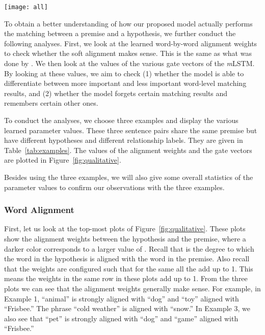 \documentclass[11pt,letterpaper]{article}
\begin{document}
\begin{figure*}[!ht]
\centering
\texttt{[image: all]}
\caption{The alignment weights and the gate vectors of the three examples.}
\label{fig:qualitative}
\end{figure*}


To obtain a better understanding of how our proposed model actually performs the matching between a premise and a hypothesis, we further conduct the following analyses.
First, we look at the learned word-by-word alignment weights  to check whether the soft alignment makes sense.
This is the same as what was done by .
We then look at the values of the various gate vectors of the {\emph{m}LSTM}.
By looking at these values, we aim to check (1) whether the model is able to differentiate between more important and less important word-level matching results, and (2) whether the model forgets certain matching results and remembers certain other ones.

To conduct the analyses, we choose three examples and display the various learned parameter values.
These three sentence pairs share the same premise but have different hypotheses and different relationship labels.
They are given in Table~\ref{tab:examples}.
The values of the alignment weights and the gate vectors are plotted in Figure~\ref{fig:qualitative}.

Besides using the three examples, we will also give some overall statistics of the parameter values to confirm our observations with the three examples.

\subsubsection*{Word Alignment}

First, let us look at the top-most plots of Figure~\ref{fig:qualitative}.
These plots show the alignment weights  between the hypothesis and the premise, where a darker color corresponds to a larger value of .
Recall that  is the degree to which the  word in the hypothesis is aligned with the  word in the premise.
Also recall that the weights  are configured such that for the same  all the  add up to 1.
This means the weights in the same row in these plots add up to 1.
From the three plots we can see that the alignment weights generally make sense.
For example, in Example 1, ``animal'' is strongly aligned with ``dog'' and ``toy'' aligned with ``Frisbee.''
The phrase ``cold weather'' is aligned with ``snow.''
In Example 3, we also see that ``pet'' is strongly aligned with ``dog'' and ``game'' aligned with ``Frisbee.''
\end{document}
